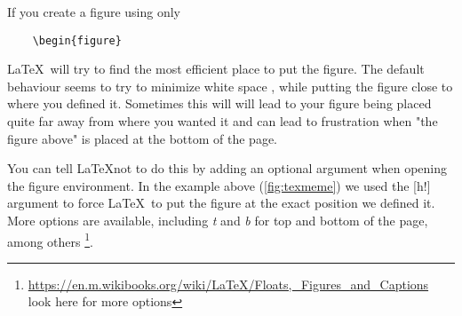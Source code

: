 If you create a figure using only 
\begin{verbatim}
    \begin{figure}
\end{verbatim}
\LaTeX~will try to find the most efficient place to put the figure. The default behaviour seems to try to minimize white space , while putting the figure close to where you defined it.
Sometimes this will will lead to your figure being placed quite far away from where you wanted it and can lead to frustration when "the figure above" is placed at the bottom of the page.

You can tell \LaTeX not to do this by adding an optional argument when opening the figure environment.
In the example above (\ref{fig:texmeme}) we used the [h!] argument to force \LaTeX~to put the figure at the exact position we defined it. More options are available, including \textit{t} and \textit{b} for top and bottom of the page, among others \footnote{\url{https://en.m.wikibooks.org/wiki/LaTeX/Floats,_Figures_and_Captions} look here for more options}.
